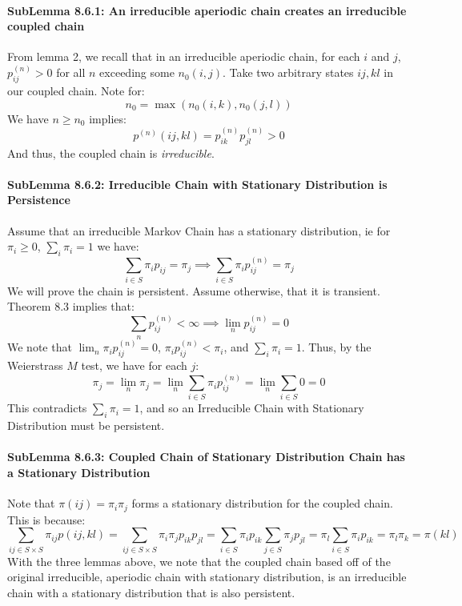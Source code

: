 \documentclass[12pt,a4paper]{article}
\newcommand{\1}[1]{\mathbbm{1}\left\{ #1 \right\}}
\begin{document}
\paragraph{SubLemma 8.6.1: An irreducible aperiodic chain creates an irreducible coupled chain} From lemma 2, we recall that in an irreducible aperiodic chain, for each $i$ and $j$, $p_{ij}^{(n)} > 0$ for all $n$ exceeding some $n_0(i,j)$. Take two arbitrary states $ij, kl$ in our coupled chain. Note for:
$$
	n_0 = \max(n_0(i,k), n_0(j,l))
$$
We have $n \geq n_0$ implies:
$$
	p^{(n)}(ij, kl) = p_{ik}^{(n)}p_{jl}^{(n)} > 0
$$
And thus, the coupled chain is \textit{irreducible}. 

\paragraph{SubLemma 8.6.2: Irreducible Chain with Stationary Distribution is Persistence} Assume that an irreducible Markov Chain has a stationary distribution, ie for $\pi_i \geq 0$, $\sum_i \pi_i = 1$ we have:
$$
	\sum_{i \in S} \pi_i p_{ij} = \pi_j \implies
	\sum_{i \in S} \pi_i p_{ij}^{(n)} = \pi_j
$$
We will prove the chain is persistent. Assume otherwise, that it is transient. Theorem 8.3 implies that:
$$
	\sum_n p_{ij}^{(n)} < \infty \implies \lim_n p_{ij}^{(n)} = 0
$$
We note that $\lim_n \pi_i p_{ij}^{(n)} = 0$, $\pi_i p_{ij}^{(n)} < \pi_i$, and $\sum_i \pi_i = 1$. Thus, by the Weierstrass $M$ test, we have for each $j$:
$$
	\pi_j = \lim_n \pi_j = \lim_n \sum_{i \in S} \pi_i p_{ij}^{(n)} = \lim_n \sum_{i \in S} 0 = 0
$$
This contradicts $\sum_i \pi_i = 1$, and so an Irreducible Chain with Stationary Distribution must be persistent.

\paragraph{SubLemma 8.6.3: Coupled Chain of Stationary Distribution Chain has a Stationary Distribution} Note that $\pi(ij) = \pi_i\pi_j$ forms a stationary distribution for the coupled chain. This is because:
$$
	\sum_{ij \in S \times S} \pi_{ij} p(ij, kl) =
	\sum_{ij \in S \times S} \pi_i\pi_j p_{ik} p_{jl} =
	\sum_{i \in S} \pi_i p_{ik} \sum_{j \in S} \pi_j p_{jl} =
	\pi_l \sum_{i \in S} \pi_i p_{ik} =
	\pi_l \pi_k = \pi(kl)
$$
With the three lemmas above, we note that the coupled chain based off of the original irreducible, aperiodic chain with stationary distribution, is an irreducible chain with a stationary distribution that is also persistent.
\end{document}
